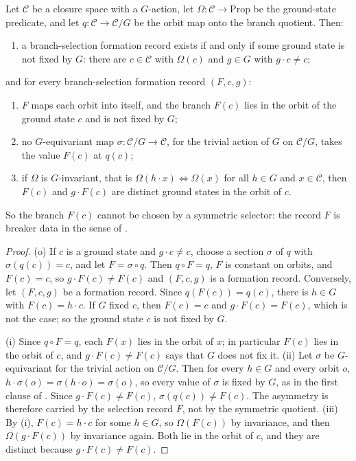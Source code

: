 \begin{theorem}\label{thm:F15b}
Let \(\mathcal C\) be a closure space with a \(G\)-action, let
\(\Omega:\mathcal C\to\mathrm{Prop}\) be the ground-state predicate,
and let \(q:\mathcal C\to\mathcal C/G\) be the orbit map onto the
branch quotient.  Then:
\begin{enumerate}[label=(\roman*)]
\item[(o)] a branch-selection formation record exists if and only if some
  ground state is not fixed by \(G\): there are \(c\in\mathcal C\) with
  \(\Omega(c)\) and \(g\in G\) with \(g\cdot c\ne c\);
\end{enumerate}
and for every branch-selection formation record \((F,c,g)\):
\begin{enumerate}[label=(\roman*)]
\item \(F\) maps each orbit into itself, and the branch \(F(c)\) lies in the
  orbit of the ground state \(c\) and is not fixed by \(G\);
\item no \(G\)-equivariant map \(\sigma:\mathcal C/G\to\mathcal C\), for the
  trivial action of \(G\) on \(\mathcal C/G\), takes the value \(F(c)\) at
  \(q(c)\);
\item if \(\Omega\) is \(G\)-invariant, that is \(\Omega(h\cdot x)\iff\Omega(x)\)
  for all \(h\in G\) and \(x\in\mathcal C\), then \(F(c)\) and \(g\cdot F(c)\)
  are distinct ground states in the orbit of \(c\).
\end{enumerate}
So the branch \(F(c)\) cannot be chosen by a symmetric selector: the record
\(F\) is breaker data in the sense of .
\end{theorem}
\begin{proof}
(o) If \(c\) is a ground state and \(g\cdot c\ne c\), choose a section
\(\sigma\) of \(q\) with \(\sigma(q(c))=c\), and let \(F=\sigma\circ q\). Then
\(q\circ F=q\), \(F\) is constant on orbits, and \(F(c)=c\), so
\(g\cdot F(c)\ne F(c)\) and \((F,c,g)\) is a formation record. Conversely, let \((F,c,g)\) be a formation record.
Since \(q(F(c))=q(c)\), there is \(h\in G\) with \(F(c)=h\cdot c\). If \(G\)
fixed \(c\), then \(F(c)=c\) and \(g\cdot F(c)=F(c)\), which is not the case;
so the ground state \(c\) is not fixed by \(G\).

(i) Since \(q\circ F=q\), each \(F(x)\) lies in the orbit of \(x\); in
particular \(F(c)\) lies in the orbit of \(c\), and \(g\cdot F(c)\ne F(c)\)
says that \(G\) does not fix it.  (ii) Let \(\sigma\) be \(G\)-equivariant for
the trivial action on \(\mathcal C/G\).  Then for every \(h\in G\) and every
orbit \(o\), \(h\cdot\sigma(o)=\sigma(h\cdot o)=\sigma(o)\), so every value of
\(\sigma\) is fixed by \(G\), as in the first clause of .  Since
\(g\cdot F(c)\ne F(c)\), \(\sigma(q(c))\ne F(c)\).  The asymmetry is therefore
carried by the selection record \(F\), not by the symmetric quotient.
(iii) By (i), \(F(c)=h\cdot c\) for some \(h\in G\), so \(\Omega(F(c))\) by
invariance, and then \(\Omega(g\cdot F(c))\) by invariance again. Both lie in
the orbit of \(c\), and they are distinct because \(g\cdot F(c)\ne F(c)\).
\end{proof}


